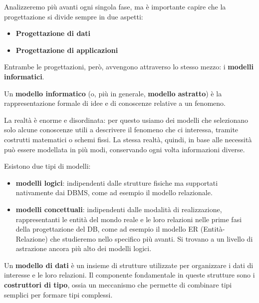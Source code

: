 \documentclass[11pt, a4paper, titlepage, oneside]{scrbook}
\begin{document}
Analizzeremo più avanti ogni singola fase, ma è importante capire che la progettazione si divide sempre in due aspetti:
\begin{itemize}
    \item \textbf{Progettazione di dati}
    \item \textbf{Progettazione di applicazioni}
\end{itemize}

Entrambe le progettazioni, però, avvengono attraverso lo stesso mezzo: i \textbf{modelli informatici}.

\begin{Definizione}
\label{def-modello-informatico}
Un \textbf{modello informatico} (o, più in generale, \textbf{modello astratto}) è la rappresentazione formale di idee e di conoscenze relative a un fenomeno.
\end{Definizione}

La realtà è enorme e disordinata: per questo usiamo dei modelli che selezionano solo alcune conoscenze utili a descrivere il fenomeno che ci interessa, tramite costrutti matematici o schemi fissi. La stessa realtà, quindi, in base alle necessità può essere modellata in più modi, conservando ogni volta informazioni diverse.

\begin{Proprieta}
\label{prop-tipi-modelli}
Esistono due tipi di modelli:
\begin{itemize}
    \item \textbf{modelli logici}: indipendenti dalle strutture fisiche ma supportati nativamente dai DBMS, come ad esempio il modello relazionale.
    \item \textbf{modelli concettuali}: indipendenti dalle modalità di realizzazione, rappresentanti le entità del mondo reale e le loro relazioni nelle prime fasi della progettazione del DB, come ad esempio il modello ER (Entità-Relazione) che studieremo nello specifico più avanti. Si trovano a un livello di astrazione ancora più alto dei modelli logici.
\end{itemize}
\end{Proprieta}

\begin{Definizione}
\label{def-modello-dati}
Un \textbf{modello di dati} è un insieme di strutture utilizzate per organizzare i dati di interesse e le loro relazioni. Il componente fondamentale in queste strutture sono i \textbf{costruttori di tipo}, ossia un meccanismo che permette di combinare tipi semplici per formare tipi complessi.  
\end{Definizione}
\end{document}
